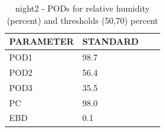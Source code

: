 \begin{table}[p!]
\begin{center}
\begin{tabular}{|l|l|l|l|}
\hline
\multicolumn{1}{|c|}{\cellcolor[HTML]{C0C0C0}\textbf{PARAMETER}} & \multicolumn{1}{c|}{\cellcolor[HTML]{C0C0C0}\textbf{STANDARD}}  \\
\hline
\cellcolor[HTML]{C0C0C0}POD1  & 98.7                                \\
\cellcolor[HTML]{C0C0C0}POD2  & 56.4                                \\
\cellcolor[HTML]{C0C0C0}POD3  & 35.5                                \\
\cellcolor[HTML]{C0C0C0}PC    & 98.0                                \\
\cellcolor[HTML]{C0C0C0}EBD   & 0.1                                \\
\hline
\end{tabular}
\caption{night2 - PODs for relative humidity (percent) and thresholds (50,70) percent}
\label{tab:podrhFT:night2}
\end{center}
\end{table}
